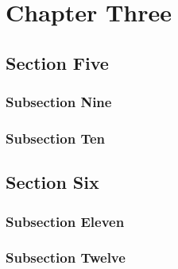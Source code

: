 \chapter{Chapter Three}
\lipsum[1-2]
\section{Section Five}
\lipsum[3-4]
\subsection{Subsection Nine}
\lipsum[5-6]
\subsection{Subsection Ten}
\lipsum[7-8]
\section{Section Six}
\lipsum[9-10]
\subsection{Subsection Eleven}
\lipsum[11-12]
\subsection{Subsection Twelve}
\lipsum[13-14]
